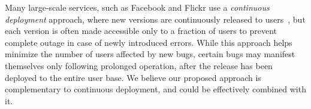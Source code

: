
Many large-scale services, such as Facebook and Flickr use a {\it continuous
deployment} approach, where new versions are continuously released to
users~\cite{johnson2009,flickr}, but each version is often made accessible only
to a fraction of users to prevent complete outage in case of newly introduced
errors.  While this approach helps minimize the number of users affected by new
bugs, certain bugs may manifest themselves only following prolonged operation,
after the release has been deployed to the entire user base.  We believe our
proposed approach is complementary to continuous deployment, and could be
effectively combined with it.

